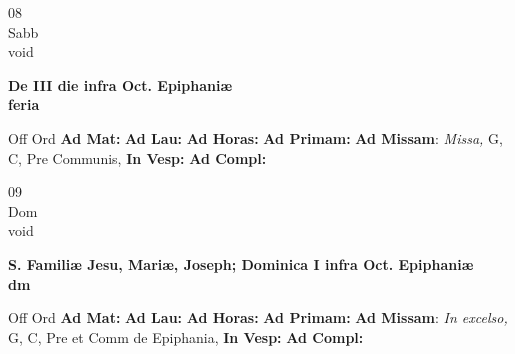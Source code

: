 \documentclass[10pt, openany]{book}
\begin{document}
    \begin{center}
        \begin{minipage}{3.5in}
            \vspace{2em}
            \begin{minipage}{0.5in}
                {\Huge 08} \\
                {\normalsize Sabb} \\
                {\normalsize void}
            \end{minipage}
            \begin{minipage}{3.0in}
                \textbf{ \large De III die infra Oct. Epiphaniæ \\
                \textnormal{\normalsize feria}} \\ 
            \end{minipage}
            \begin{justify}Off Ord
                \textbf{Ad Mat: }
                \textbf{Ad Lau: }
                \textbf{Ad Horas: }
                \textbf{Ad Primam: }\textbf{Ad Missam}: \textit{Missa,} G, C, Pre Communis,  
                \textbf{In Vesp: }
                \textbf{Ad Compl: }
            \end{justify}
        \end{minipage}
    \end{center}

    \begin{center}
        \begin{minipage}{3.5in}
            \vspace{2em}
            \begin{minipage}{0.5in}
                {\Huge 09} \\
                {\normalsize Dom} \\
                {\normalsize void}
            \end{minipage}
            \begin{minipage}{3.0in}
                \textbf{ \large S. Familiæ Jesu, Mariæ, Joseph; Dominica I infra Oct. Epiphaniæ \\
                \textnormal{\normalsize dm}} \\ 
            \end{minipage}
            \begin{justify}Off Ord
                \textbf{Ad Mat: }
                \textbf{Ad Lau: }
                \textbf{Ad Horas: }
                \textbf{Ad Primam: }\textbf{Ad Missam}: \textit{In excelso,} G, C, Pre et Comm de Epiphania,  
                \textbf{In Vesp: }
                \textbf{Ad Compl: }
            \end{justify}
        \end{minipage}
    \end{center}
\end{document}
